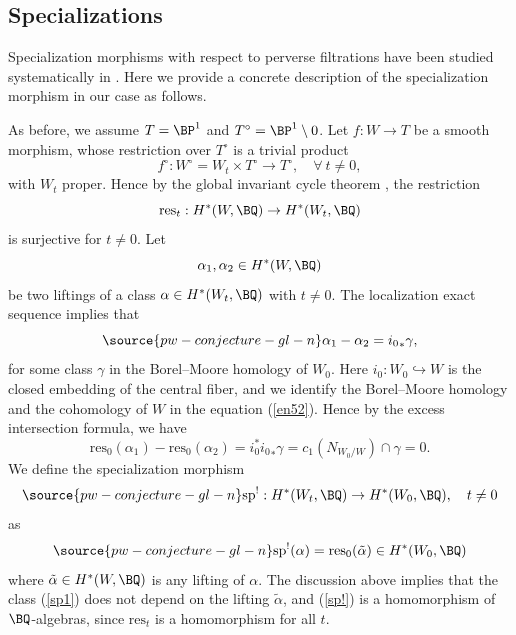 \subsection{Specializations}\label{section4.3} Specialization morphisms with respect to perverse filtrations have been studied systematically in \cite{dCM,sp}. Here we provide a concrete description of the specialization morphism in our case as follows.

As before, we assume $T = \BP^1$ and $T^\circ = \BP^1 \setminus 0$. Let $f: W \to T$ be a smooth morphism, whose restriction over $T^\circ$ is a trivial product
\[
f^\circ: W^\circ = W_t \times T^\circ \rightarrow T^\circ, \quad \forall~ t\neq 0,
\]
with $W_t$ proper.
Hence by the global invariant cycle theorem \cite[Theorem 1.7.1]{dCM1}, the restriction
\[
\mathrm{res}_t:  H^*(W, \BQ) \to H^*(W_t, \BQ)
\]
is surjective for $t \neq 0$. Let
\[
\alpha_1, \alpha_2 \in H^*(W, \BQ)
\]
be two liftings of a class $\alpha \in H^*(W_t, \BQ)$ with $t\neq 0$. The localization exact sequence implies that
\begin{equation}\label{en52}
\source{pw-conjecture-gl-n}
\alpha_1 - \alpha_2 = {i_0}_* \gamma,
\end{equation}
for some class $\gamma$
 in the Borel--Moore homology of $W_0$.  Here $i_0: W_0 \hookrightarrow W$ is the closed embedding of the central fiber, and we identify the Borel--Moore homology and the cohomology of $W$ in the equation (\ref{en52}). Hence by the excess intersection formula, we have
\[
\mathrm{res}_0(\alpha_1) - \mathrm{res}_0(\alpha_2) = i_0^*{i_0}_* \gamma = c_1(N_{W_0/W})\cap \gamma =0.
\]
We define the specialization morphism
\begin{equation}\label{sp!}
\source{pw-conjecture-gl-n}
\mathrm{sp}^!: H^*(W_t, \BQ) \rightarrow H^*(W_0, \BQ), \quad t\neq 0
\end{equation}
as
\begin{equation}\label{sp1}
\source{pw-conjecture-gl-n}
\mathrm{sp^!}(\alpha) = \mathrm{res}_0(\tilde{\alpha}) \in H^*(W_0, \BQ)
\end{equation}
where $\tilde{\alpha} \in H^*(W, \BQ)$ is any lifting of $\alpha$. The discussion above implies that the class (\ref{sp1}) does not depend on the lifting $\tilde{\alpha}$, and (\ref{sp!}) is a homomorphism of $\BQ$-algebras,
since $\mathrm{res}_t$ is a homomorphism for all $t$.


